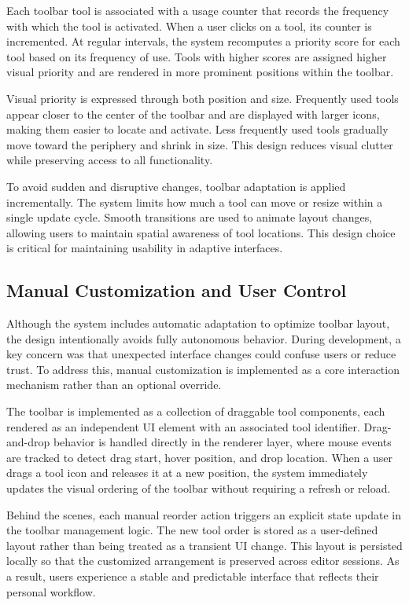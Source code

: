 \documentclass[sigconf]{acmart}
\begin{document}
Each toolbar tool is associated with a usage counter that records the frequency with which the tool is activated. When a user clicks on a tool, its counter is incremented. At regular intervals, the system recomputes a priority score for each tool based on its frequency of use. Tools with higher scores are assigned higher visual priority and are rendered in more prominent positions within the toolbar.

Visual priority is expressed through both position and size. Frequently used tools appear closer to the center of the toolbar and are displayed with larger icons, making them easier to locate and activate. Less frequently used tools gradually move toward the periphery and shrink in size. This design reduces visual clutter while preserving access to all functionality.

To avoid sudden and disruptive changes, toolbar adaptation is applied incrementally. The system limits how much a tool can move or resize within a single update cycle. Smooth transitions are used to animate layout changes, allowing users to maintain spatial awareness of tool locations. This design choice is critical for maintaining usability in adaptive interfaces.

\subsection{Manual Customization and User Control}

Although the system includes automatic adaptation to optimize toolbar layout, the design intentionally avoids fully autonomous behavior. During development, a key concern was that unexpected interface changes could confuse users or reduce trust. To address this, manual customization is implemented as a core interaction mechanism rather than an optional override.

The toolbar is implemented as a collection of draggable tool components, each rendered as an independent UI element with an associated tool identifier. Drag-and-drop behavior is handled directly in the renderer layer, where mouse events are tracked to detect drag start, hover position, and drop location. When a user drags a tool icon and releases it at a new position, the system immediately updates the visual ordering of the toolbar without requiring a refresh or reload.

Behind the scenes, each manual reorder action triggers an explicit state update in the toolbar management logic. The new tool order is stored as a user-defined layout rather than being treated as a transient UI change. This layout is persisted locally so that the customized arrangement is preserved across editor sessions. As a result, users experience a stable and predictable interface that reflects their personal workflow.
\end{document}
